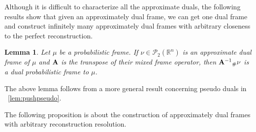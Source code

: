 \documentclass{amsart}
\numberwithin{equation}{section}
\theoremstyle{plain}
\newtheorem{lemma}[theorem]{Lemma}
\theoremstyle{remark}
\theoremstyle{definition}
\begin{document}
Although it is difficult to characterize all the approximate duals, the following results show that given an approximately dual frame,  we can get one dual frame and construct infinitely many approximately dual frames with arbitrary closeness to the perfect reconstruction. 

\begin{lemma}
    Let $\mu$ be a probabilistic frame.  If $\nu \in \mathcal{P}_2(\mathbb{R}^n)$ is an approximate dual frame of $\mu$ and ${\bf A}$ is the transpose of their mixed frame operator, then ${{\bf A}^{-1}}_\#\nu$ is a dual probabilistic frame to $\mu$.
\end{lemma}
The above lemma follows from a more general result concerning pseudo duals in ~\cref{lem:pushpseudo}.

The following proposition is about the construction of approximately dual frames with arbitrary reconstruction resolution.
\end{document}
